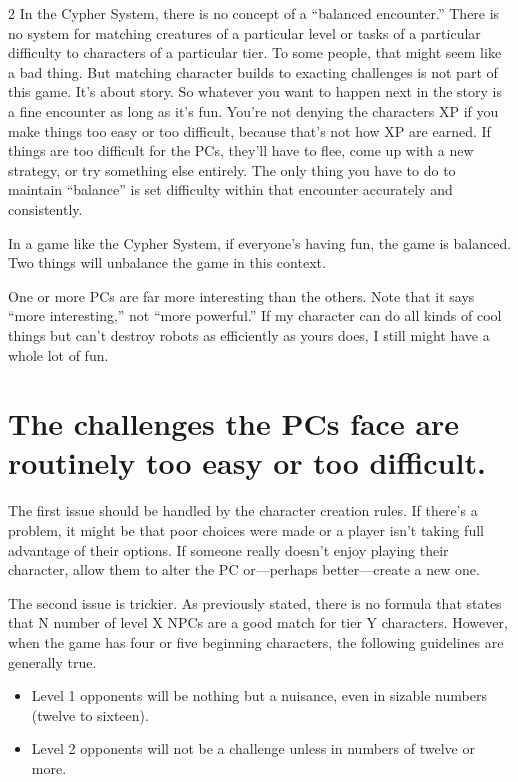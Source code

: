 \begin{multicols}{2}
In the Cypher System, there is no concept of a “balanced encounter.” There is no system for matching creatures of a particular level or tasks of a particular difficulty to characters of a particular tier. To some people, that might seem like a bad thing. But matching character builds to exacting challenges is not part of this game. It’s about story. So whatever you want to happen next in the story is a fine encounter as long as it’s fun. You’re not denying the characters XP if you make things too easy or too difficult, because that’s not how XP are earned. If things are too difficult for the PCs, they’ll have to flee, come up with a new strategy, or try something else entirely. The only thing you have to do to maintain “balance” is set difficulty within that encounter accurately and consistently.

In a game like the Cypher System, if everyone’s having fun, the game is balanced. Two things will unbalance the game in this context.

One or more PCs are far more interesting than the others. Note that it says “more interesting,” not “more powerful.” If my character can do all kinds of cool things but can’t destroy robots as efficiently as yours does, I still might have a whole lot of fun.

\section{The challenges the PCs face are routinely too easy or too difficult.}

The first issue should be handled by the character creation rules. If there’s a problem, it might be that poor choices were made or a player isn’t taking full advantage of their options. If someone really doesn’t enjoy playing their character, allow them to alter the PC or—perhaps better—create a new one.

The second issue is trickier. As previously stated, there is no formula that states that N number of level X NPCs are a good match for tier Y characters. However, when the game has four or five beginning characters, the following guidelines are generally true.

\begin{itemize}
\item Level 1 opponents will be nothing but a nuisance, even in sizable numbers (twelve to sixteen).

\item Level 2 opponents will not be a challenge unless in numbers of twelve or more.


\end{itemize}
\end{multicols}
